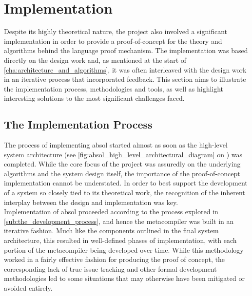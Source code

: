 
\chapter{Implementation} %
\label{cha:implementation}
Despite its highly theoretical nature, the project also involved a significant implementation in order to provide a proof-of-concept for the theory and algorithms behind the language proof mechanism. 
The implementation was based directly on the design work and, as mentioned at the start of \autoref{cha:architecture_and_algorithms}, it was often interleaved with the design work in an iterative process that incorporated feedback. 
This section aims to illustrate the implementation process, methodologies and tools, as well as highlight interesting solutions to the most significant challenges faced. 

\section{The Implementation Process} %
\label{sec:the_implementation_process}
The process of implementing \gls{absol} started almost as soon as the high-level system architecture (see \autoref{fig:absol_high_level_architectural_diagram} on ) was completed. 
While the core focus of the project was assuredly on the underlying algorithms and the system design itself, the importance of the proof-of-concept implementation cannot be understated. 
In order to best support the development of a system so closely tied to its theoretical work, the recognition of the inherent interplay between the design and implementation was key. \\

Implementation of \gls{absol} proceeded according to the process explored in \autoref{sub:the_development_process}, and hence the metacompiler was built in an iterative fashion.
Much like the components outlined in the final system architecture, this resulted in well-defined phases of implementation, with each portion of the metacompiler being developed over time. 
While this methodology worked in a fairly effective fashion for producing the proof of concept, the corresponding lack of true issue tracking and other formal development methodologies led to some situations that may otherwise have been mitigated or avoided entirely.

